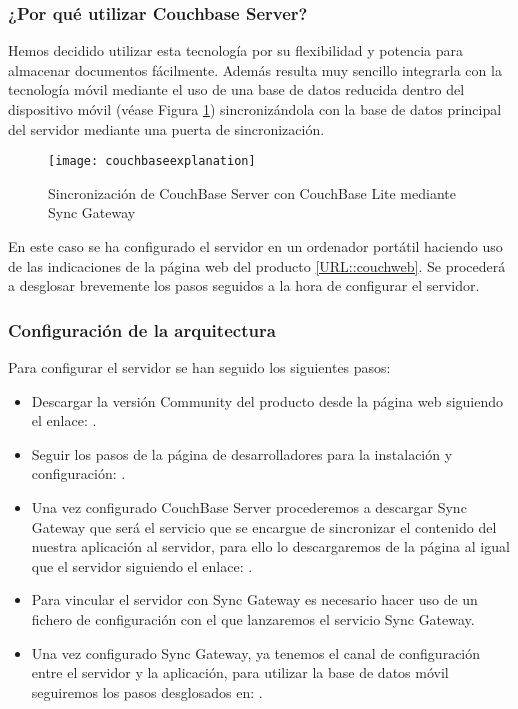 \subsubsection{¿Por qué utilizar Couchbase Server?}

Hemos decidido utilizar esta tecnología por su flexibilidad y potencia para almacenar documentos fácilmente. Además resulta muy sencillo integrarla con la tecnología móvil mediante el uso de una base de datos reducida dentro del dispositivo móvil (véase Figura \ref{fig:couchbaseexplanation}) sincronizándola con la base de datos principal del servidor mediante una puerta de sincronización.

\begin{figure}[H]
	\centering
	\texttt{[image: couchbaseexplanation]}
	\caption{Sincronización de CouchBase Server con CouchBase Lite mediante Sync Gateway}
	\label{fig:couchbaseexplanation}
\end{figure}

En este caso se ha configurado el servidor en un ordenador portátil haciendo uso de las indicaciones de la página web del producto \ref{URL::couchweb}. Se procederá a desglosar brevemente los pasos seguidos a la hora de configurar el servidor.


\subsubsection{Configuración de la arquitectura}

Para configurar el servidor se han seguido los siguientes pasos: 


\begin{itemize}
\item Descargar la versión Community del producto desde la página web siguiendo el enlace: \cite{URL::couchbaseDownload}. 
\item Seguir los pasos de la página de desarrolladores para la instalación y configuración: \cite{URL::couchBaseGuide}. 
\item Una vez configurado CouchBase Server procederemos a descargar Sync Gateway que será el servicio que se encargue de sincronizar el contenido del nuestra aplicación al servidor, para ello lo descargaremos de la página al igual que el servidor siguiendo el enlace: \cite{URL::couchbaseDownload} .
\item Para vincular el servidor con Sync Gateway es necesario hacer uso de un fichero de configuración con el que lanzaremos el servicio Sync Gateway.
\item Una vez configurado Sync Gateway, ya tenemos el canal de configuración entre el servidor y la aplicación, para utilizar la base de datos móvil seguiremos los pasos desglosados en: \cite{URL::couchBaseLite} .
\end{itemize}


